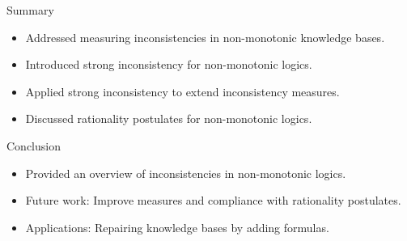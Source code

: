 \begin{frame}{Summary}
    \begin{itemize}
        \item Addressed measuring inconsistencies in non-monotonic knowledge bases.
        \item Introduced strong inconsistency for non-monotonic logics.
        \item Applied strong inconsistency to extend inconsistency measures.
        \item Discussed rationality postulates for non-monotonic logics.
    \end{itemize}
\end{frame}

\begin{frame}{Conclusion}
    \begin{itemize}
        \item Provided an overview of inconsistencies in non-monotonic logics.
        \item Future work: Improve measures and compliance with rationality postulates.
        \item Applications: Repairing knowledge bases by adding formulas.
    \end{itemize}
\end{frame}
